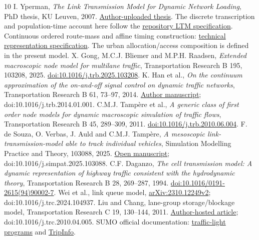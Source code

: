 \documentclass[10pt,a4paper]{article}
\newcommand{\head}[1]{\par\vspace{4pt}\noindent\textbf{#1}\par\nobreak\vspace{1pt}}
\begin{document}
\makeatletter
\renewcommand{\section}{\@ifstar{\head}{\head}}
\makeatother
\begin{thebibliography}{10}
\setlength{\itemsep}{0pt}\setlength{\parskip}{0pt}
{\color{revisionred}I. Yperman, \emph{The Link Transmission Model for Dynamic
Network Loading}, PhD thesis, KU Leuven, 2007.
\href{https://www.researchgate.net/publication/28360292_The_Link_Transmission_Model_for_dynamic_network_loading}{Author-uploaded thesis}.
The discrete transcription and population-time account here follow the
\href{../../../../docs/milestones/milestone_0_ltm_baseline.md}{repository LTM specification}.}
{\color{revisionred}Continuous ordered route-mass and affine timing construction:
\href{../../../../docs/milestones/milestone_1_ordered_route_mass_ledger.md}
{technical representation specification}. The urban allocation/access
composition is defined in the present model.}
{\color{revisionred}X. Gong, M.C.J. Bliemer and M.P.H. Raadsen,
\emph{Extended macroscopic node model for multilane traffic},
Transportation Research B 195, 103208, 2025.
\href{https://doi.org/10.1016/j.trb.2025.103208}{doi:10.1016/j.trb.2025.103208}.}
{\color{revisionred}K. Han et al., \emph{On the continuum approximation of the
on-and-off signal control on dynamic traffic networks}, Transportation
Research B 61, 73--97, 2014.
\href{https://arxiv.org/abs/1309.3461}{Author manuscript};
doi:10.1016/j.trb.2014.01.001.}
{\color{revisionred}C.M.J. Tamp\`ere et al., \emph{A generic class of first order
node models for dynamic macroscopic simulation of traffic flows},
Transportation Research B 45, 289--309, 2011.
\href{https://doi.org/10.1016/j.trb.2010.06.004}{doi:10.1016/j.trb.2010.06.004}.}
{\color{revisionred}F. de Souza, O. Verbas, J. Auld and C.M.J. Tamp\`ere,
\emph{A mesoscopic link-transmission-model able to track individual vehicles},
Simulation Modelling Practice and Theory, 103088, 2025.
\href{https://www.osti.gov/servlets/purl/2569501}{Open manuscript};
doi:10.1016/j.simpat.2025.103088.}
{\color{revisionred}C.F. Daganzo, \emph{The cell transmission model: A dynamic
representation of highway traffic consistent with the hydrodynamic theory},
Transportation Research B 28, 269--287, 1994.
\href{https://doi.org/10.1016/0191-2615(94)90002-7}{doi:10.1016/0191-2615(94)90002-7}.}
{\color{revisionred}Wei et al., link queue model,
\href{https://arxiv.org/html/2310.12249v2}{arXiv:2310.12249v2};
doi:10.1016/j.trc.2024.104937.}
{\color{revisionred}Liu and Chang, lane-group storage/blockage model,
Transportation Research C 19, 130--144, 2011.
\href{https://attap.umd.edu/wp-content/uploads/2022/05/TRC522.pdf}{Author-hosted article};
doi:10.1016/j.trc.2010.04.005.}
{\color{revisionred}SUMO official documentation:
\href{https://sumo.dlr.de/docs/Simulation/Traffic_Lights.html}{traffic-light programs}
and \href{https://sumo.dlr.de/docs/Simulation/Output/TripInfo.html}{TripInfo}.}
\end{thebibliography}
\end{document}
